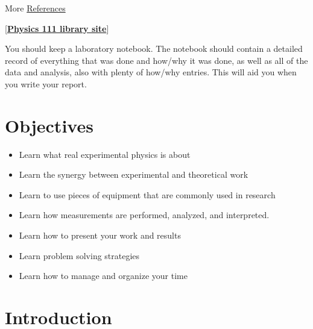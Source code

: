 \documentclass{../lab}
\begin{document}
\noindent More \hyperref[sec:References]{References}

[\href{http://physics111.lib.berkeley.edu/Physics111/Reprints/RUT/RUT\_index.html}{\textbf{Physics 111 library site}}]

You should keep a laboratory notebook. The notebook should contain a detailed record of everything that was done and how/why it was done, as well as all of the data and analysis, also with plenty of how/why entries. This will aid you when you write your report.

\section{Objectives}

\begin{itemize}
    \item Learn what real experimental physics is about

    \item Learn the synergy between experimental and theoretical work

    \item Learn to use pieces of equipment that are commonly used in research

    \item Learn how measurements are performed, analyzed, and interpreted.

    \item Learn how to present your work and results

    \item Learn problem solving strategies

    \item Learn how to manage and organize your time
\end{itemize}

\section{Introduction}
\end{document}
